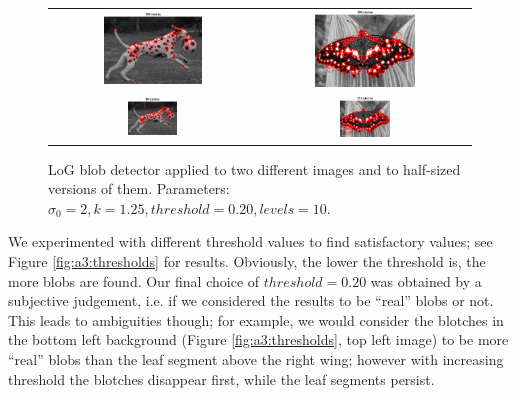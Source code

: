 \begin{figure}[h]
	\centering
	\begin{tabular}{cc}
		\includegraphics[width=0.5\textwidth]{figures/a3_dalmation_k020_full.png} &
		\includegraphics[width=0.5\textwidth]{figures/a3_butterfly_k020.png} \\
		\includegraphics[width=0.25\textwidth]{figures/a3_dalmation_k020_half.png} &
		\includegraphics[width=0.25\textwidth]{figures/a3_butterfly_k020_small.png} \\
	\end{tabular}
	\caption{LoG blob detector applied to two different images and to half-sized versions of them. Parameters: $\sigma_0=2, k=1.25, threshold=0.20, levels=10$.}
	\label{fig:a3:general}
\end{figure}

We experimented with different threshold values to find satisfactory values; see Figure \ref{fig:a3:thresholds} for results. Obviously, the lower the threshold is, the more blobs are found. Our final choice of $threshold=0.20$ was obtained by a subjective judgement, i.e. if we considered the results to be ``real'' blobs or not. This leads to ambiguities though; for example, we would consider the blotches in the bottom left background (Figure \ref{fig:a3:thresholds}, top left image) to be more ``real'' blobs than the leaf segment above the right wing; however with increasing threshold the blotches disappear first, while the leaf segments persist.

